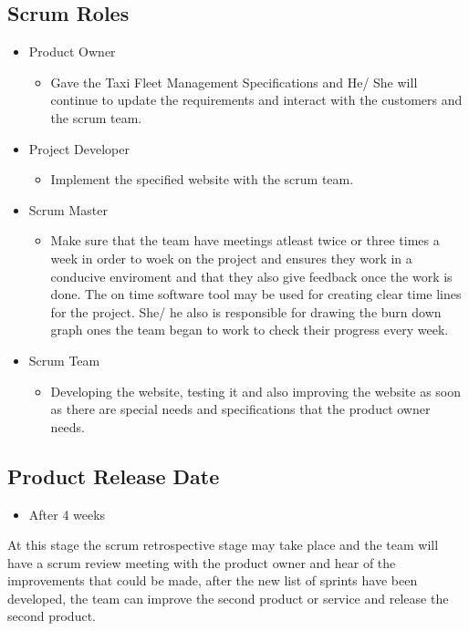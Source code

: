 \documentclass[10pt,twocolumn]{witseiepaper}
\begin{document}
\subsection{Scrum Roles}

\begin{itemize} 
\item Product Owner
\begin{itemize} 
\item Gave the Taxi Fleet Management Specifications and He/ She will continue to update the requirements and interact with the customers and the scrum team. 
\end{itemize}

\item Project Developer
\begin{itemize} 
\item Implement the specified website with the scrum team.
\end{itemize}

\item Scrum Master
\begin{itemize} 
\item Make sure that the team have meetings atleast twice or three times a week in order to woek on the project and ensures they work in a conducive enviroment and that they also give feedback once the work is done.  The on time software tool may be used for creating clear time lines for the project. She/ he also is responsible for drawing the burn down graph ones the team began to work to check their progress every week. 
\end{itemize}

\item Scrum Team
\begin{itemize} 
\item Developing the website, testing it and also improving the website as soon as there are special needs and specifications that the product owner needs. 
\end{itemize}
\end{itemize}

\subsection{Product Release Date}
\begin{itemize} 
\item After 4 weeks 
\end{itemize}

At this stage the scrum retrospective stage may take place and the team will have a scrum review meeting with the product owner and hear of the improvements that could be made, after the new list of sprints have been developed, the team can improve the second product or service and release the second product. 



%



\end{document}
